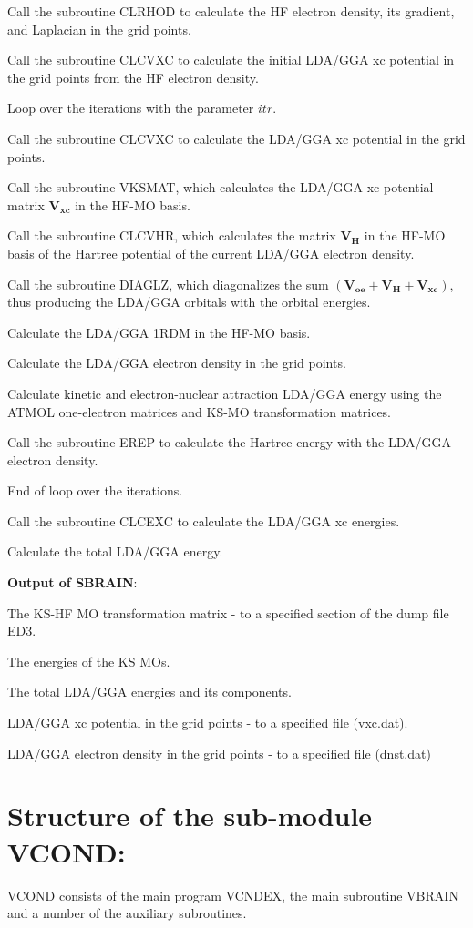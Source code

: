 \documentclass[onecolumn,preprintnumbers,amsmath,amssymb]{revtex4}
\begin{document}
Call the subroutine CLRHOD to calculate the HF electron density, its gradient, and Laplacian in the grid points.

Call the subroutine CLCVXC to calculate the initial LDA/GGA xc potential in the grid points from the HF electron density.

Loop over the iterations with the parameter $itr$.

Call the subroutine CLCVXC to calculate the LDA/GGA xc potential in the grid points.

Call the subroutine VKSMAT, which calculates the LDA/GGA xc potential matrix $\mathbf{V_{xc}}$ in the HF-MO basis.

Call the subroutine CLCVHR, which calculates the matrix $\mathbf{V_{H}}$ in the HF-MO basis of the Hartree potential of the current LDA/GGA electron density. 

Call the subroutine DIAGLZ, which diagonalizes the sum $(\mathbf{V_{oe}}+\mathbf{V_{H}}+\mathbf{V_{xc}})$, thus producing the LDA/GGA orbitals with the orbital energies.

Calculate the LDA/GGA 1RDM in the HF-MO basis.

Calculate the LDA/GGA electron density in the grid points.

Calculate kinetic and electron-nuclear attraction LDA/GGA energy using the ATMOL one-electron matrices and KS-MO transformation matrices.

Call the subroutine EREP to calculate the Hartree energy with the LDA/GGA electron density. 

End of loop over the iterations.

Call the subroutine CLCEXC to calculate the LDA/GGA xc energies.

Calculate the total LDA/GGA energy.

\textbf{Output of SBRAIN}:

The KS-HF MO transformation matrix - to a specified section of the dump file ED3.

The energies of the KS MOs.

The total LDA/GGA energies and its components.

LDA/GGA xc potential in the grid points - to a specified file (vxc.dat).

LDA/GGA electron density in the grid points - to a specified file (dnst.dat)

\section{Structure of the sub-module VCOND:} 
VCOND consists of the main program VCNDEX, the main subroutine VBRAIN and a number of the auxiliary subroutines.
\end{document}
